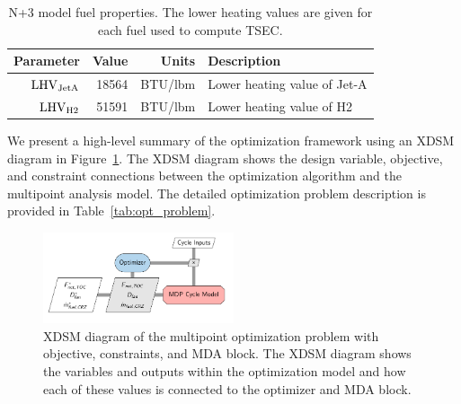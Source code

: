 \documentclass[conf]{new-aiaa}
\begin{document}
\begin{table}[hbt!]
    \centering
    \caption{
        N+3 model fuel properties.
        The lower heating values are given for each fuel used to compute TSEC.}
    \begin{tabular}{r r r l}
        \hline
        Parameter              & Value & Units        & Description                  \\
        \hline
        $\rm{LHV}_{\rm{JetA}}$ & 18564 & \si{BTU/lbm} & Lower heating value of Jet-A \\
        $\rm{LHV}_{\rm{H2}}$   & 51591 & \si{BTU/lbm} & Lower heating value of H2    \\
        \hline
    \end{tabular}
    \label{fuel_props}
\end{table}

We present a high-level summary of the optimization framework using an XDSM diagram in Figure~\ref{fig:N3_opt_xdsm}.
The XDSM diagram shows the design variable, objective, and constraint connections between the optimization algorithm and the multipoint analysis model.
The detailed optimization problem description is provided in Table~\ref{tab:opt_problem}.

\begin{figure}[!hbt]
    \centering
    \includegraphics[width=0.5\textwidth]{N3_opt_XDSM.pdf}
    \caption{
        XDSM diagram of the multipoint optimization problem with objective, constraints, and MDA block.
        The XDSM diagram shows the variables and outputs within the optimization model and how each of these values is connected to the optimizer and MDA block.}
    \label{fig:N3_opt_xdsm}
\end{figure}
\end{document}
